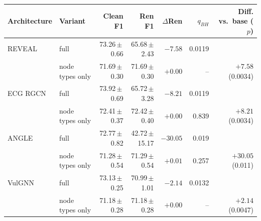 \begin{tabular}{llrrrrr}
\toprule
Architecture & Variant & Clean F1 & Ren F1 & $\Delta$Ren & $q_{BH}$ & Diff. vs.\ base ($p$) \\
\midrule
REVEAL & full & 73.26\,$\pm$\,0.66 & 65.68\,$\pm$\,2.43 & $\mathbf{-7.58}$ & 0.0119 &  \\
 & node types only & 71.69\,$\pm$\,0.30 & 71.69\,$\pm$\,0.30 & $+0.00$ & -- & $+7.58$ (0.0034) \\
\midrule
ECG RGCN & full & 73.92\,$\pm$\,0.69 & 65.72\,$\pm$\,3.28 & $\mathbf{-8.21}$ & 0.0119 &  \\
 & node types only & 72.41\,$\pm$\,0.37 & 72.42\,$\pm$\,0.40 & $+0.00$ & 0.839 & $+8.21$ (0.0034) \\
\midrule
ANGLE & full & 72.77\,$\pm$\,0.82 & 42.72\,$\pm$\,15.17 & $\mathbf{-30.05}$ & 0.019 &  \\
 & node types only & 71.28\,$\pm$\,0.54 & 71.29\,$\pm$\,0.54 & $+0.01$ & 0.257 & $+30.05$ (0.011) \\
\midrule
VulGNN & full & 73.13\,$\pm$\,0.25 & 70.99\,$\pm$\,1.01 & $\mathbf{-2.14}$ & 0.0132 &  \\
 & node types only & 71.18\,$\pm$\,0.28 & 71.18\,$\pm$\,0.28 & $+0.00$ & -- & $+2.14$ (0.0047) \\
\bottomrule
\end{tabular}
